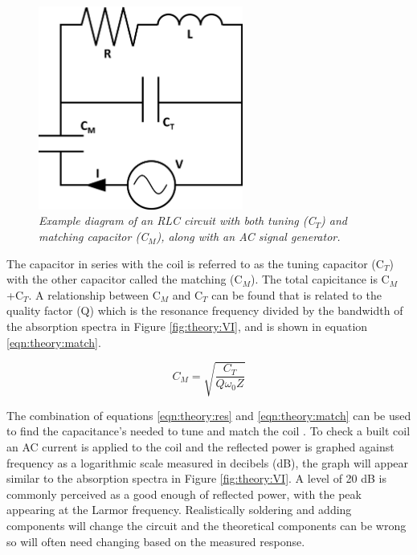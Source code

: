 \documentclass[class=article, crop=false]{standalone}
\begin{document}
\begin{figure}
    \centering
    \includegraphics[width=0.6\textwidth]{Figures/Theory/RLC_Circuit.png}
    \caption{\textit{Example diagram of an RLC circuit with both tuning (C$_T$) and matching capacitor (C$_M$), along with an AC signal generator.}}
    \label{fig:theory:RLC}
\end{figure}

The capacitor in series with the coil is referred to as the tuning capacitor (C$_T$) with the other capacitor called the matching (C$_M$). The total capicitance is C$_M$+C$_T$. A relationship between C$_M$ and C$_T$ can be found that is related to the quality factor (Q) \cite{Chen1989ChapterNoise} which is the resonance frequency divided by the bandwidth of the absorption spectra in Figure \ref{fig:theory:VI}, and is shown in equation \ref{eqn:theory:match}. 

\begin{equation}
    C_M = \sqrt{\frac{C_T}{Q\omega_0Z}}
    \label{eqn:theory:match}
\end{equation}

The combination of equations \ref{eqn:theory:res} and \ref{eqn:theory:match} can be used to find the capacitance's needed to tune and match the coil \cite{Chen1989ChapterNoise}. To check a built coil an AC current is applied to the coil and the reflected power is graphed against frequency as a logarithmic scale measured in decibels (dB), the graph will appear similar to the absorption spectra in Figure \ref{fig:theory:VI}. A level of 20 dB is commonly perceived as a good enough of reflected power, with the peak appearing at the Larmor frequency. Realistically soldering and adding components will change the circuit and the theoretical components can be wrong so will often need changing based on the measured response.
\end{document}
